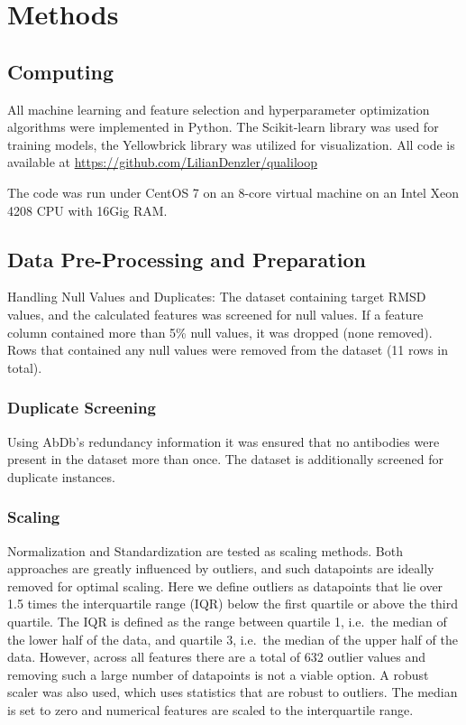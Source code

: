 \documentclass[12pt]{article}
\begin{document}
\section{Methods}

\subsection{Computing}
All machine learning and feature selection and hyperparameter
optimization algorithms were implemented in Python. The Scikit-learn
library was used for training models, the
Yellowbrick\cite{Bengfort2021} library was utilized for
visualization. All code is available at
\url{https://github.com/LilianDenzler/qualiloop}

The code was run under CentOS 7 on an 8-core virtual machine on an
Intel Xeon 4208 CPU with 16Gig RAM.

\subsection{Data Pre-Processing and Preparation}
Handling Null Values and Duplicates: The dataset containing target
RMSD values, and the calculated features was screened for null
values. If a feature column contained more than 5\% null values, it
was dropped (none removed). Rows that contained any null values were
removed from the dataset (11 rows in total).

\subsubsection{Duplicate Screening}
Using AbDb's redundancy information it was ensured that no antibodies
were present in the dataset more than once. The dataset is
additionally screened for duplicate instances.

\subsubsection{Scaling}
Normalization and Standardization are tested as scaling methods. Both
approaches are greatly influenced by outliers, and such datapoints are
ideally removed for optimal scaling. Here we define outliers as
datapoints that lie over 1.5 times the interquartile range (IQR) below
the first quartile or above the third quartile. The IQR is defined as
the range between quartile 1, i.e.\ the median of the lower half of the
data, and quartile 3, i.e.\ the median of the upper half of the
data. However, across all features there are a total of 632 outlier
values and removing such a large number of datapoints is not a viable
option. A robust scaler was also used, which uses statistics that are
robust to outliers. The median is set to zero and numerical features
are scaled to the interquartile range.
\end{document}
